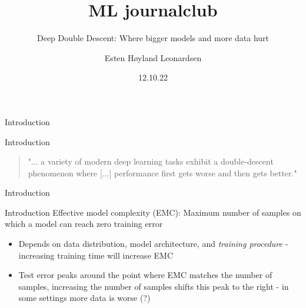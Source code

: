 \documentclass[8pt]{beamer}
\author{Esten H{\o}yland Leonardsen}
\institute[Life Science, UiO]{UiO:Life Science, University of Oslo}
\date{12.10.22}
\title{ML journalclub}
\subtitle{Deep Double Descent: Where bigger models and more data hurt}
\begin{document}
	\maketitle

	\begin{frame}{Introduction}
		\centering
		\vfill
		\vfill
	\end{frame}

	\begin{frame}{Introduction}
		\begin{quote}
			\centering
			"... a variety of modern deep learning tasks exhibit a double-descent phenomenon where [...] performance first gets worse and then gets better."
		\end{quote}
	\end{frame}

	\begin{frame}{Introduction}
		\centering
		\vfill
		\vfill
	\end{frame}

	\begin{frame}{Introduction}
		Effective model complexity (EMC): Maximum number of samples on which a model can reach zero training error
		\begin{itemize}
			\item Depends on data distribution, model architecture, and \textit{training procedure} - increasing training time will increase EMC
			\item Test error peaks around the point where EMC matches the number of samples, increasing the number of samples shifts this peak to the right - in some settings more data is worse (?)
		\end{itemize}
	\end{frame}
\end{document}
